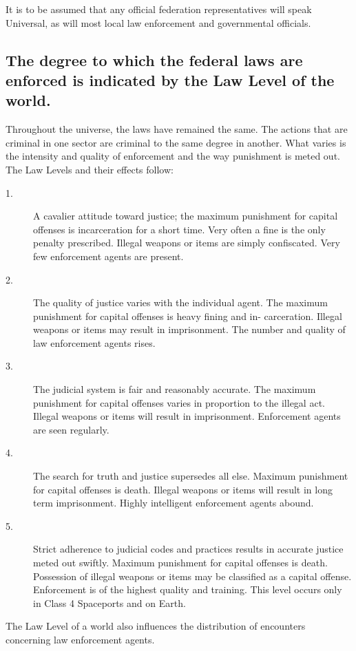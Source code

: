 It is to be assumed that any official federation representatives will
speak Universal, as will most local law enforcement and governmental
officials.

\subsection[Law Level]{The degree to which the federal laws are
  enforced is indicated by the Law Level of the world.}
\label{sec:law-level}

Throughout the universe, the laws have remained the same. The actions
that are criminal in one sector are criminal to the same degree in
another. What varies is the intensity and quality of enforcement and
the way punishment is meted out. The Law Levels and their effects
follow:

\begin{description}
\item[1.] A cavalier attitude toward justice; the maximum punishment
  for capital offenses is incarceration for a short time. Very often a
  fine is the only penalty prescribed. Illegal weapons or items are
  simply confiscated. Very few enforcement agents are present.
\item[2.] The quality of justice varies with the individual agent. The
  maximum punishment for capital offenses is heavy fining and in-
  carceration. Illegal weapons or items may result in imprisonment.
  The number and quality of law enforcement agents rises.
\item[3.] The judicial system is fair and reasonably accurate. The
  maximum punishment for capital offenses varies in proportion to the
  illegal act. Illegal weapons or items will result in imprisonment.
  Enforcement agents are seen regularly.
\item[4.] The search for truth and justice supersedes all else.
  Maximum punishment for capital offenses is death. Illegal weapons or
  items will result in long term imprisonment. Highly intelligent
  enforcement agents abound.
\item[5.] Strict adherence to judicial codes and practices results in
  accurate justice meted out swiftly. Maximum punishment for capital
  offenses is death. Possession of illegal weapons or items may be
  classified as a capital offense. Enforcement is of the highest
  quality and training. This level occurs only in Class 4 Spaceports
  and on Earth.
\end{description}

The Law Level of a world also influences the distribution of
encounters concerning law enforcement agents.


